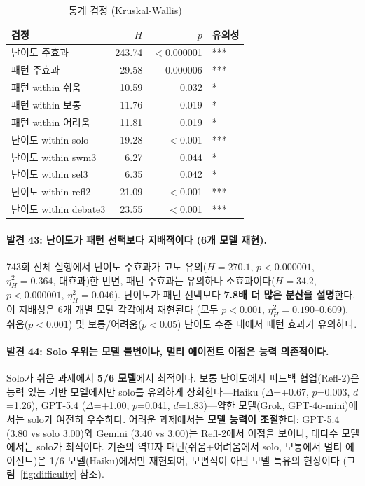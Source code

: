 \documentclass[a4paper,11pt]{article}
\begin{document}
\begin{table}[H]
\centering
\caption{통계 검정 (Kruskal-Wallis)}
\label{tab:kw-difficulty}
{\small
\begin{tabular}{lrrl}
\toprule
검정 & $H$ & $p$ & 유의성 \\
\midrule
난이도 주효과             & 243.74 & $<$0.000001 & *** \\
패턴 주효과               & 29.58  & 0.000006    & *** \\
패턴 within 쉬움          & 10.59 & 0.032       & * \\
패턴 within 보통          & 11.76 & 0.019       & * \\
패턴 within 어려움        & 11.81 & 0.019       & * \\
난이도 within solo        & 19.28 & $<$0.001    & *** \\
난이도 within swm3        & 6.27  & 0.044       & * \\
난이도 within sel3        & 6.35  & 0.042       & * \\
난이도 within refl2       & 21.09 & $<$0.001    & *** \\
난이도 within debate3     & 23.55 & $<$0.001    & *** \\
\bottomrule
\end{tabular}
}
\end{table}

\paragraph{발견 43: 난이도가 패턴 선택보다 지배적이다 (6개 모델 재현).}
743회 전체 실행에서 난이도 주효과가 고도 유의($H=270.1$, $p<0.000001$, $\eta^{2}_{H}=0.364$, 대효과)한 반면, 패턴 주효과는 유의하나 소효과이다($H=34.2$, $p<0.000001$, $\eta^{2}_{H}=0.046$). 난이도가 패턴 선택보다 \textbf{7.8배 더 많은 분산을 설명}한다. 이 지배성은 6개 개별 모델 각각에서 재현된다 (모두 $p<0.001$, $\eta^{2}_{H}=0.190$--$0.609$). 쉬움($p<0.001$) 및 보통/어려움($p<0.05$) 난이도 수준 내에서 패턴 효과가 유의하다.

\paragraph{발견 44: Solo 우위는 모델 불변이나, 멀티 에이전트 이점은 능력 의존적이다.}
Solo가 쉬운 과제에서 \textbf{5/6 모델}에서 최적이다. 보통 난이도에서 피드백 협업(Refl-2)은 능력 있는 기반 모델에서만 solo를 유의하게 상회한다---Haiku ($\Delta$=+0.67, $p$=0.003, $d$=1.26), GPT-5.4 ($\Delta$=+1.00, $p$=0.041, $d$=1.83)---약한 모델(Grok, GPT-4o-mini)에서는 solo가 여전히 우수하다. 어려운 과제에서는 \textbf{모델 능력이 조절}한다: GPT-5.4 (3.80 vs solo 3.00)와 Gemini (3.40 vs 3.00)는 Refl-2에서 이점을 보이나, 대다수 모델에서는 solo가 최적이다. 기존의 역U자 패턴(쉬움+어려움에서 solo, 보통에서 멀티 에이전트)은 1/6 모델(Haiku)에서만 재현되어, 보편적이 아닌 모델 특유의 현상이다 (그림~\ref{fig:difficulty} 참조).
\end{document}
